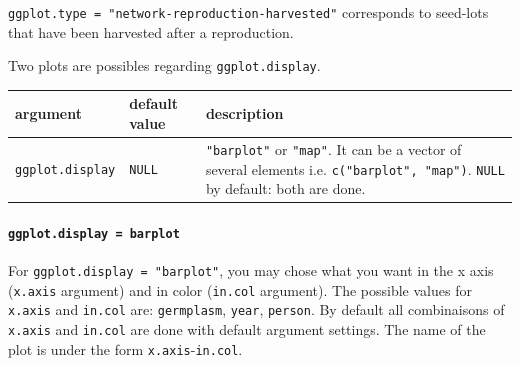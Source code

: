 \documentclass{article}\usepackage[]{graphicx}\usepackage[]{color}
\begin{document}
\texttt{ggplot.type = "network-reproduction-harvested"} corresponds to seed-lots that have been harvested after a reproduction.


Two plots are possibles regarding \texttt{ggplot.display}.

\begin{center}
\begin{tabular}{ p{} p{} p{} }
\hline
argument & default value & description \\
\hline
\texttt{ggplot.display} & \texttt{NULL} & \texttt{"barplot"} or  \texttt{"map"}.
It can be a vector of several elements i.e. \texttt{c("barplot", "map")}. 
\texttt{NULL} by default: both are done. \\
\hline
\end{tabular}
\end{center}


\paragraph{\texttt{ggplot.display = barplot}}

For \texttt{ggplot.display = "barplot"}, you may chose what you want in the x axis (\texttt{x.axis} argument) and in color (\texttt{in.col} argument).
The possible values for \texttt{x.axis} and \texttt{in.col} are: \texttt{germplasm}, \texttt{year}, \texttt{person}.
By default all combinaisons of \texttt{x.axis} and \texttt{in.col} are done with default argument settings.
The name of the plot is under the form \texttt{x.axis}-\texttt{in.col}.
\end{document}
